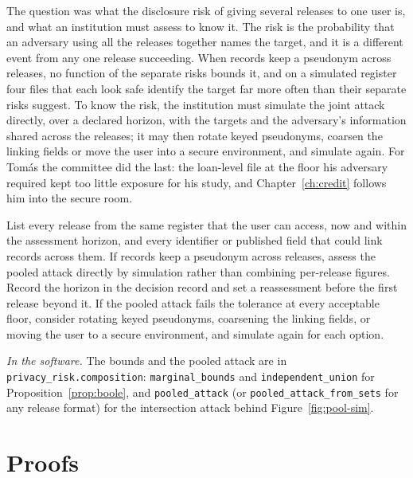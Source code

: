 The question was what the disclosure risk of giving several releases to one user is, and what
an institution must assess to know it. The risk is the probability that an adversary using all
the releases together names the target, and it is a different event from any one release
succeeding. When records keep a pseudonym across releases, no function of the separate risks
bounds it, and on a simulated register four files that each look safe identify the target far
more often than their separate risks suggest. To know the risk, the institution must simulate
the joint attack directly, over a declared horizon, with the targets and the adversary's
information shared across the releases; it may then rotate keyed pseudonyms, coarsen the linking
fields or move the user into a secure environment, and simulate again. For Tomás the committee
did the last: the loan-level file at the floor his adversary required kept too little exposure
for his study, and Chapter~\ref{ch:credit} follows him into the secure room.

\begin{inpractice}
List every release from the same register that the user can access, now and within
the assessment horizon, and every identifier or published field that could link
records across them. If records keep a pseudonym across releases, assess the pooled
attack directly by simulation rather than combining per-release figures. Record the
horizon in the decision record and set a reassessment before the first release
beyond it. If the pooled attack fails the tolerance at every acceptable floor,
consider rotating keyed pseudonyms, coarsening the linking fields, or moving the
user to a secure environment, and simulate again for each option.

\smallskip\noindent\textit{In the software.} The bounds and the pooled attack are
in \texttt{privacy\_risk.composition}: \texttt{marginal\_bounds} and
\texttt{independent\_union} for Proposition~\ref{prop:boole}, and
\texttt{pooled\_attack} (or \texttt{pooled\_attack\_from\_sets} for any release
format) for the intersection attack behind Figure~\ref{fig:pool-sim}.
\end{inpractice}

\section{Proofs}

